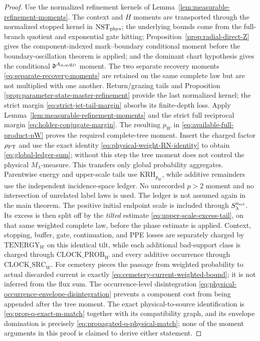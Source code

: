 \documentclass[11pt]{article}
\begin{document}
\begin{proof}
Use the normalized refinement kernels of
Lemma~\ref{lem:measurable-refinement-moments}.  The context and $H$ moments
are transported through the normalized stopped kernel in
$\mathrm{NST}_{\rm phys}$; the underlying bounds come from the full-branch
quotient and exponential gate hitting;
Proposition~\ref{prop:radial-direct-Z} gives the component-indexed
mark--boundary conditional moment before the boundary-oscillation theorem is
applied; and the dominant chart hypothesis gives the conditional
$\mathfrak d^{A_{\rm dom}q_D}$ moment.  The two separate recovery moments
\eqref{eq:separate-recovery-moments} are retained on the same complete law
but are not multiplied with one another.  Return/grazing tails and Proposition
\ref{prop:parameter-state-master-refinement} provide the last normalized
kernel; the strict margin \eqref{eq:strict-jet-tail-margin} absorbs its
finite-depth loss.  Apply Lemma~\ref{lem:measurable-refinement-moments} and
the strict full reciprocal margin \eqref{eq:holder-conjugate-margin}.  The
resulting $p_W$ in \eqref{eq:available-full-product-pW} proves the required
complete-tree moment.  Insert the charged factor $\rho_{\rm PT}$ and use the
exact identity \eqref{eq:physical-weight-RN-identity} to obtain
\eqref{eq:global-ledger-sum}; without this step the tree moment does not
control the physical $M_\lambda$-measure.  This transfers only global
probability aggregates.  Parentwise energy and upper-scale tails use
$\mathrm{KRH}_{p_W}$, while additive remainders use the independent
incidence-space ledger.  No unrecorded $p>2$ moment and no intersection of
unrelated label laws is used.  The ledger is not assumed again in the main
theorem.
The positive initial endpoint scale is included through
$S_\lambda^{a_{\rm scl}}$.  Its excess is then split off by the
\emph{tilted} estimate \eqref{eq:upper-scale-excess-tail}, on that same
weighted complete law, before the phase estimate is applied.  Context,
stopping, buffer, gate, continuation, and PPE losses are separately charged
by $\mathrm{TENERGY}_{W}$ on this identical tilt, while each additional
bad-support class is charged through $\mathrm{CLOCK\_PROB}_{W}$ and every
additive occurrence through $\mathrm{CLOCK\_SRC}_{W}$.  For cemetery pieces the
passage from weighted probability to actual discarded current is exactly
\eqref{eq:cemetery-current-weighted-bound}; it is not inferred from the
flux sum.
The occurrence-level disintegration
\eqref{eq:physical-occurrence-envelope-disintegration} prevents a component
cost from being appended after the tree moment.  The exact
physical-to-source identification is \eqref{eq:prop-q-exact-m-match}
together with its compatibility graph, and its envelope domination is precisely
\eqref{eq:propagated-q-physical-match}; none of the moment arguments in this
proof is claimed to derive either statement.
\end{proof}
\end{document}
